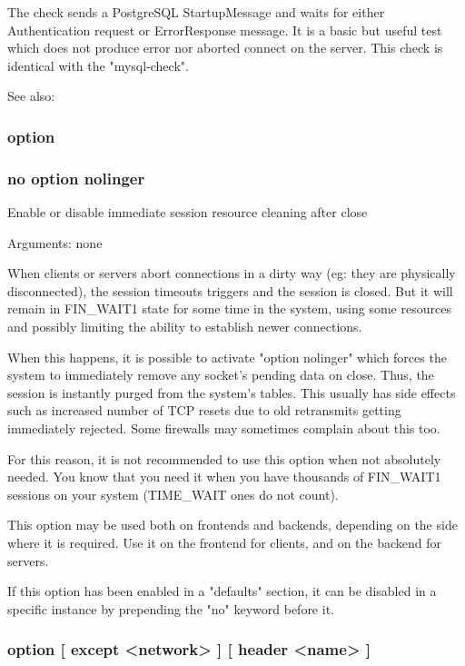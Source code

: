 {  The check sends a PostgreSQL StartupMessage and waits for either
  Authentication request or ErrorResponse message. It is a basic but useful
  test which does not produce error nor aborted connect on the server.
  This check is identical with the "mysql-check".

  See also: 

\subsubsection[nolinger]{option }
\subsubsection*{no option nolinger}


  Enable or disable immediate session resource cleaning after close


  Arguments: none

  When clients or servers abort connections in a dirty way (eg: they are
  physically disconnected), the session timeouts triggers and the session is
  closed. But it will remain in FIN\_WAIT1 state for some time in the system,
  using some resources and possibly limiting the ability to establish newer
  connections.

  When this happens, it is possible to activate "option nolinger" which forces
  the system to immediately remove any socket's pending data on close. Thus,
  the session is instantly purged from the system's tables. This usually has
  side effects such as increased number of TCP resets due to old retransmits
  getting immediately rejected. Some firewalls may sometimes complain about
  this too.

  For this reason, it is not recommended to use this option when not absolutely
  needed. You know that you need it when you have thousands of FIN\_WAIT1
  sessions on your system (TIME\_WAIT ones do not count).

  This option may be used both on frontends and backends, depending on the side
  where it is required. Use it on the frontend for clients, and on the backend
  for servers.

  If this option has been enabled in a "defaults" section, it can be disabled
  in a specific instance by prepending the "no" keyword before it.

\subsubsection[originalto]{option  [ except <network> ] [ header <name> ]}

}
